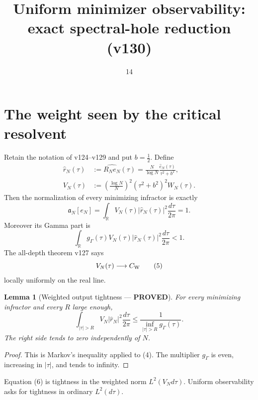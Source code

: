 \documentclass[11pt]{article}
\title{Uniform minimizer observability: exact spectral-hole reduction (v130)}
\date{14}
\newcommand{\PROVED}{\textcolor{green!40!black}{\textbf{PROVED}}}
\newtheorem{lemma}{Lemma}
\begin{document}
\maketitle

\section{The weight seen by the critical resolvent}

Retain the notation of v124--v129 and put $b=\frac12$.  Define
\begin{align}
 \widehat r_N(\tau)
 &:=\widehat{R_Ne_N}(\tau)
   =\frac{N}{\log N}\frac{\widehat e_N(\tau)}{\tau^2+b^2},       \tag{1}\\
 V_N(\tau)
 &:=\left(\frac{\log N}{N}\right)^2
       (\tau^2+b^2)^2W_N(\tau).                                  \tag{2}
\end{align}
Then the normalization of every minimizing infractor is exactly
\begin{equation}
 \boxed{
 \mathfrak a_N[e_N]
 =\int_{\mathbb R}V_N(\tau)|\widehat r_N(\tau)|^2
       \frac{d\tau}{2\pi}=1.}                                   \tag{3}
\end{equation}
Moreover its Gamma part is
\begin{equation}
 \int_{\mathbb R}g_\Gamma(\tau)V_N(\tau)
       |\widehat r_N(\tau)|^2\frac{d\tau}{2\pi}<1.              \tag{4}
\end{equation}
The all-depth theorem v127 says
\begin{equation}
 V_N(\tau)\longrightarrow C_{\rm W}                              \tag{5}
\end{equation}
locally uniformly on the real line.

\begin{lemma}[Weighted output tightness --- \PROVED]
For every minimizing infractor and every $R$ large enough,
\begin{equation}
 \int_{|\tau|>R}V_N|\widehat r_N|^2\frac{d\tau}{2\pi}
 \le \frac1{\inf_{|\tau|>R}g_\Gamma(\tau)}.                    \tag{6}
\end{equation}
The right side tends to zero independently of $N$.
\end{lemma}

\begin{proof}
This is Markov's inequality applied to (4).  The multiplier
$g_\Gamma$ is even, increasing in $|\tau|$, and tends to infinity.
\end{proof}

Equation (6) is tightness in the weighted norm $L^2(V_Nd\tau)$.
Uniform observability asks for tightness in ordinary $L^2(d\tau)$.
\end{document}
